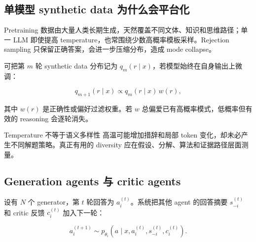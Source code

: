 \documentclass[a4paper]{article}
\begin{document}
\subsection{单模型 synthetic data 为什么会平台化}



Pretraining 数据由大量人类长期生成，天然覆盖不同文体、知识和思维路径；单一 LLM 即使提高 temperature，也常围绕少数高概率模板采样。Rejection sampling 只保留正确答案，会进一步压缩分布，造成 mode collapse。

可把第 $m$ 轮 synthetic data 分布记为 $q_m(r\mid x)$，若模型始终在自身输出上微调：

$$
q_{m+1}(r\mid x)\propto q_m(r\mid x)\,w(r),
$$

其中 $w(r)$ 是正确性或偏好过滤权重。若 $w$ 总偏爱已有高概率模式，低概率但有效的 reasoning 会逐轮消失。

\begin{warningbox}{Temperature 不等于语义多样性}
高温可能增加措辞和局部 token 变化，却未必产生不同解题策略。真正有用的 diversity 应在假设、分解、算法和证据路径层面测量。
\end{warningbox}

\subsection{Generation agents 与 critic agents}




设有 $N$ 个 generator，第 $t$ 轮回答为 $a_i^{(t)}$。系统把其他 agent 的回答摘要 $s_{-i}^{(t)}$ 和 critic 反馈 $c_i^{(t)}$ 加入下一轮：

$$
a_i^{(t+1)}\sim p_{\theta_i}
\left(a\mid x,a_i^{(t)},s_{-i}^{(t)},c_i^{(t)}\right).
$$
\end{document}
